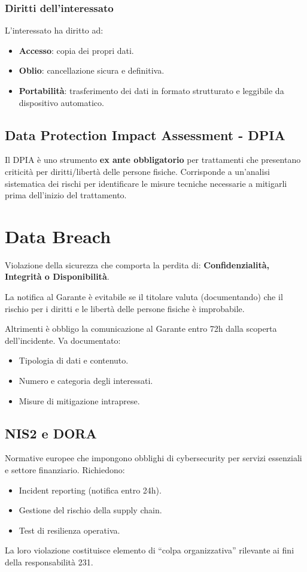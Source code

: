 \documentclass[11pt,a4paper]{article}
\begin{document}
\subsubsection{Diritti dell'interessato}
L'interessato ha diritto ad:
\begin{itemize}
    \item \textbf{Accesso}: copia dei propri dati.
    \item \textbf{Oblio}: cancellazione sicura e definitiva.
    \item \textbf{Portabilità}: trasferimento dei dati in formato strutturato e leggibile da dispositivo automatico.
\end{itemize}

\subsection{Data Protection Impact Assessment - DPIA}
Il DPIA è uno strumento \textbf{ex ante obbligatorio} per trattamenti che presentano criticità per diritti/libertà delle persone fisiche. Corrisponde a un'analisi sistematica dei rischi per identificare le misure tecniche necessarie a mitigarli prima dell'inizio del trattamento.

\section{Data Breach}
Violazione della sicurezza che comporta la perdita di: \textbf{Confidenzialità, Integrità o Disponibilità}.

La notifica al Garante è evitabile se il titolare valuta (documentando) che il rischio per i diritti e le libertà delle persone fisiche è improbabile.

Altrimenti è obbligo la comunicazione al Garante entro 72h dalla scoperta dell'incidente. Va documentato:
\begin{itemize}
    \item Tipologia di dati e contenuto.
    \item Numero e categoria degli interessati.
    \item Misure di mitigazione intraprese.
\end{itemize}

\subsection{NIS2 e DORA}
Normative europee che impongono obblighi di cybersecurity per servizi essenziali e settore finanziario. Richiedono:
\begin{itemize}
    \item Incident reporting (notifica entro 24h).
    \item Gestione del rischio della supply chain.
    \item Test di resilienza operativa.
\end{itemize}
La loro violazione costituisce elemento di ``colpa organizzativa'' rilevante ai fini della responsabilità 231.
\end{document}
